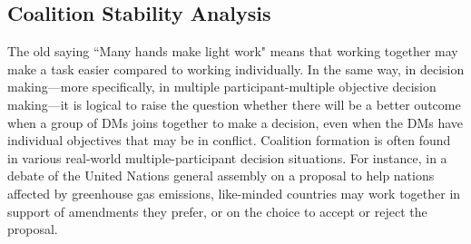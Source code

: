 %
%
%
%

\subsection{Coalition Stability Analysis}\label{subsec-coal-stabl-anal}

The old saying ``Many hands make light work" means that working together may make a task easier compared to working individually. In the same way, in decision making---more specifically, in multiple participant-multiple objective decision making---it is logical to raise the question whether there will be a better outcome when a group of DMs joins together to make a decision, even when the DMs have individual objectives that may be in conflict. Coalition formation is often found in various real-world multiple-participant decision situations. For instance, in a debate of the United Nations general assembly on a proposal to help nations affected by greenhouse gas emissions, like-minded countries may work together in support of amendments they prefer, or on the choice to accept or reject the proposal.

